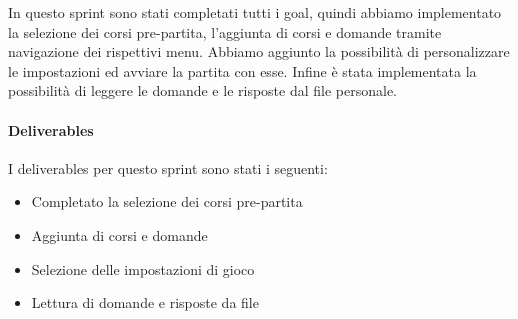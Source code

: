 In questo sprint sono stati completati tutti i goal, quindi abbiamo implementato la selezione dei corsi pre-partita, l'aggiunta di corsi e domande tramite navigazione dei rispettivi menu. Abbiamo aggiunto la possibilità di personalizzare le impostazioni ed avviare la partita con esse. Infine è stata implementata la possibilità di leggere le domande e le risposte dal file personale.
\paragraph{Deliverables} 
I deliverables per questo sprint sono stati i seguenti:
\begin{itemize}
    \item Completato la selezione dei corsi pre-partita
    \item Aggiunta di corsi e domande
    \item Selezione delle impostazioni di gioco
    \item Lettura di domande e risposte da file
\end{itemize}
